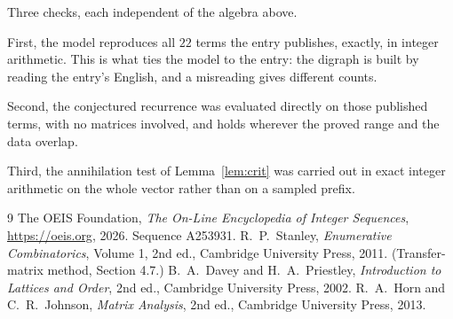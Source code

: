 \documentclass[11pt,a4paper]{article}
\theoremstyle{plain}
\theoremstyle{definition}
\begin{document}
Three checks, each independent of the algebra above.

First, the model reproduces all $22$ terms the entry publishes, exactly, in integer
arithmetic. This is what ties the model to the entry: the digraph is built by reading the
entry's English, and a misreading gives different counts.

Second, the conjectured recurrence was evaluated directly on those published terms, with no
matrices involved, and holds wherever the proved range and the data overlap.

Third, the annihilation test of Lemma~\ref{lem:crit} was carried out in exact integer
arithmetic on the whole vector rather than on a sampled prefix.

\begin{thebibliography}{9}
 The OEIS Foundation, \emph{The On-Line Encyclopedia of Integer
Sequences}, \url{https://oeis.org}, 2026. Sequence A253931.
 R.~P.~Stanley, \emph{Enumerative Combinatorics}, Volume 1, 2nd ed.,
Cambridge University Press, 2011. (Transfer-matrix method, Section 4.7.)
 B.~A.~Davey and H.~A.~Priestley, \emph{Introduction to Lattices and
Order}, 2nd ed., Cambridge University Press, 2002.
 R.~A.~Horn and C.~R.~Johnson, \emph{Matrix Analysis}, 2nd ed., Cambridge
University Press, 2013.
\end{thebibliography}
\end{document}
